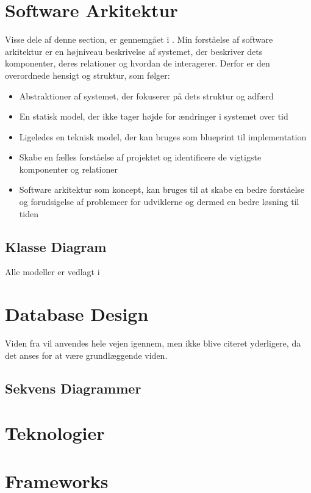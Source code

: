 \section{Software Arkitektur}
Visse dele af denne section, er gennemgået i . 
Min forståelse af software arkitektur er en højniveau beskrivelse af systemet, der beskriver dets komponenter, deres relationer og hvordan de interagerer. Derfor er den overordnede hensigt og struktur, som følger:
\begin{itemize}
    \item Abstraktioner af systemet, der fokuserer på dets struktur og adfærd
    \item En statisk model, der ikke tager højde for ændringer i systemet over tid
    \item Ligeledes en teknisk model, der kan bruges som blueprint til implementation
    \item Skabe en fælles forståelse af projektet og identificere de vigtigste komponenter og relationer
    \item Software arkitektur som koncept, kan bruges til at skabe en bedre forståelse og forudsigelse af problemeer for udviklerne og dermed en bedre løsning til tiden
\end{itemize}

\subsection{Klasse Diagram}
Alle modeller er vedlagt i 

\section{Database Design}
Viden fra \cite{connolly2023database} vil anvendes hele vejen igennem, men ikke blive citeret yderligere, da det anses for at være grundlæggende viden.

\subsection{Sekvens Diagrammer}

\section{Teknologier}

\section{Frameworks}

